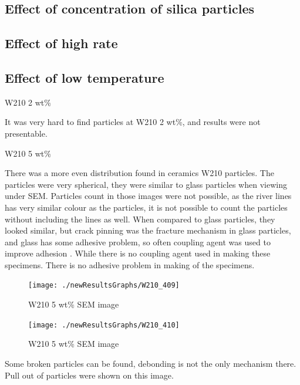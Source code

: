 \documentclass[numbers=noendperiod,chapterprefix=on]{icldt} %
\begin{document}
\subsection{Effect of concentration of silica particles}

\subsection{Effect of high rate}

\subsection{Effect of low temperature}

W210 2 wt\%

It was very hard to find particles at W210 2 wt\%, and results were not presentable.

W210 5 wt\%

There was a more even distribution found in ceramics W210 particles. The particles were very spherical, they were similar to glass particles when viewing under SEM. Particles count in those images were not possible, as the river lines has very similar colour as the particles, it is not possible to count the particles without including the lines as well.
When compared to glass particles, they looked similar, but crack pinning was the fracture mechanism in glass particles, and glass has some adhesive problem, so often coupling agent was used to improve adhesion \cite{Spanoudakis1984}.
While there is no coupling agent used in making these specimens. There is no adhesive problem in making of the specimens.

\begin{figure}[!hp]
\centering
\texttt{[image: ./newResultsGraphs/W210\_409]}
\caption{W210 5 wt\% SEM image} \label{W210_409}
\end{figure}
\FloatBarrier


\begin{figure}[!hp]
\centering
\texttt{[image: ./newResultsGraphs/W210\_410]}
\caption{W210 5 wt\% SEM image} \label{W210_410}
\end{figure}
\FloatBarrier

Some broken particles can be found, debonding is not the only mechanism there. Pull out of particles were shown on this image.
\end{document}
